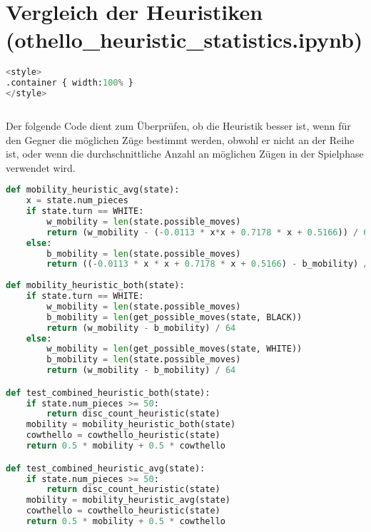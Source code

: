 \hypertarget{vergleich-der-heuristiken-othello_heuristic_statistics.ipynb}{%
\section{Vergleich der Heuristiken
(othello\_heuristic\_statistics.ipynb)}\label{vergleich-der-heuristiken-othello_heuristic_statistics.ipynb}}

\label{sec:heuristiccomparison}

\begin{lstlisting}[language=Python]
%%HTML
<style>
.container { width:100% }
</style>
\end{lstlisting}

\begin{lstlisting}[language=Python]
%run othello_test_util.ipynb
\end{lstlisting}

Der folgende Code dient zum Überprüfen, ob die Heuristik besser ist,
wenn für den Gegner die möglichen Züge bestimmt werden, obwohl er nicht
an der Reihe ist, oder wenn die durchschnittliche Anzahl an möglichen
Zügen in der Spielphase verwendet wird.

\begin{lstlisting}[language=Python]
def mobility_heuristic_avg(state):
    x = state.num_pieces
    if state.turn == WHITE:
        w_mobility = len(state.possible_moves)
        return (w_mobility - (-0.0113 * x*x + 0.7178 * x + 0.5166)) / 64
    else:
        b_mobility = len(state.possible_moves)
        return ((-0.0113 * x * x + 0.7178 * x + 0.5166) - b_mobility) / 64
    
def mobility_heuristic_both(state):
    if state.turn == WHITE:
        w_mobility = len(state.possible_moves)
        b_mobility = len(get_possible_moves(state, BLACK))
        return (w_mobility - b_mobility) / 64
    else:
        w_mobility = len(get_possible_moves(state, WHITE))
        b_mobility = len(state.possible_moves)
        return (w_mobility - b_mobility) / 64

def test_combined_heuristic_both(state):
    if state.num_pieces >= 50:
        return disc_count_heuristic(state)
    mobility = mobility_heuristic_both(state)
    cowthello = cowthello_heuristic(state)
    return 0.5 * mobility + 0.5 * cowthello

def test_combined_heuristic_avg(state):
    if state.num_pieces >= 50:
        return disc_count_heuristic(state)
    mobility = mobility_heuristic_avg(state)
    cowthello = cowthello_heuristic(state)
    return 0.5 * mobility + 0.5 * cowthello
\end{lstlisting}

